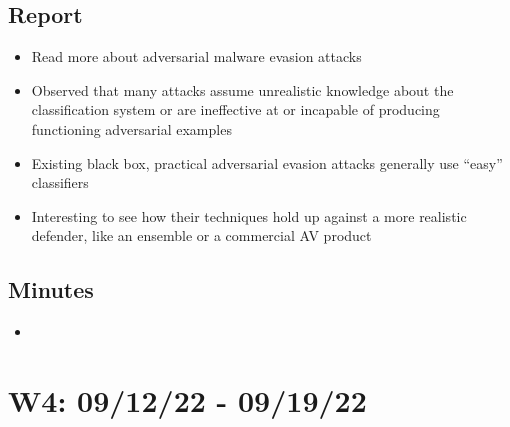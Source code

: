 \documentclass{article}
\begin{document}
\subsection*{Report}

\begin{itemize}
	\item Read more about adversarial malware evasion attacks
	\item Observed that many attacks assume unrealistic knowledge about the classification system or are ineffective at or incapable of producing functioning adversarial examples
	\item Existing black box, practical adversarial evasion attacks generally use ``easy'' classifiers
	\item Interesting to see how their techniques hold up against a more realistic defender, like an ensemble or a commercial AV product
\end{itemize}

\subsection*{Minutes}

\begin{itemize}
	\item 
\end{itemize}

\pagebreak

\section*{W4: 09/12/22 - 09/19/22}

\end{document}
